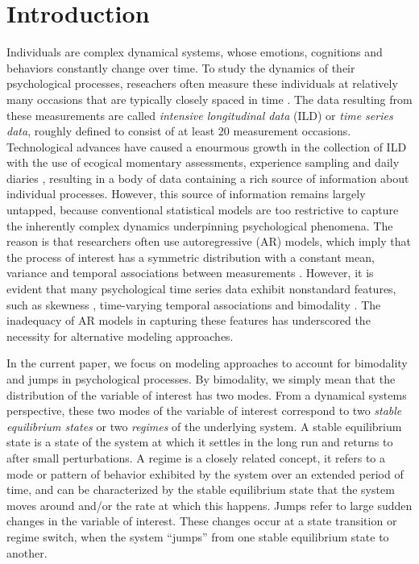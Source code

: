 \documentclass{article}
\begin{document}
\section{Introduction}
Individuals are complex dynamical systems, whose emotions, cognitions and behaviors constantly change over time.
To study the dynamics of their psychological processes, reseachers often measure these individuals at relatively many occasions that are typically closely spaced in time \citep{bolger2013intensive, walls2006models}.
The data resulting from these measurements are called \textit{intensive longitudinal data} (ILD) or \textit{time series data}, roughly defined to consist of at least 20 measurement occasions.
Technological advances have caused a enourmous growth in the collection of ILD with the use of ecogical momentary assessments, experience sampling and daily diaries \citep{notimelikethepresent}, resulting in a body of data containing a rich source of information about individual processes.
However, this source of information remains largely untapped, because conventional statistical models are too restrictive to capture the inherently complex dynamics underpinning psychological phenomena.
The reason is that researchers often use autoregressive (AR) models, which imply that the process of interest has a symmetric distribution with a constant mean, variance and temporal associations between measurements \citep{box_jenkins, chatfield}.
However, it is evident that many psychological time series data exhibit nonstandard features, such as skewness \citep{skewness_oisin, skewness_2, skewness_3}, time-varying temporal associations \citep{changing_inertia_1, changing_inertia_2} and bimodality \citep{skewness_oisin, bimodality_han}.
The inadequacy of AR models in capturing these features has underscored the necessity for alternative modeling approaches.

In the current paper, we focus on modeling approaches to account for bimodality and jumps in psychological processes.
By bimodality, we simply mean that the distribution of the variable of interest has two modes.
From a dynamical systems perspective, these two modes of the variable of interest correspond to two \textit{stable equilibrium states} or two \textit{regimes} of the underlying system.
A stable equilibrium state is a state of the system at which it settles in the long run and returns to after small perturbations.
A regime is a closely related concept, it refers to a mode or pattern of behavior exhibited by the system over an extended period of time, and can be characterized by the stable equilibrium state that the system moves around and/or the rate at which this happens.
Jumps refer to large sudden changes in the variable of interest.
These changes occur at a state transition or regime switch, when the system ``jumps'' from one stable equilibrium state to another.
\end{document}
